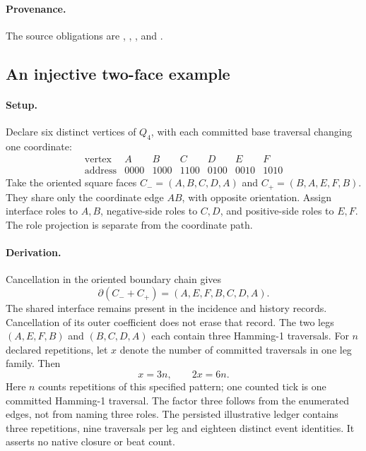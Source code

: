 \paragraph{Provenance.}
The source obligations are , , ,  and .

\subsection{An injective two-face example}\label{manual2:two-face-example}
\paragraph{Setup.}
Declare six distinct vertices of \(Q_4\), with each committed base traversal changing one coordinate:
\[
\begin{array}{c|cccccc}
\text{vertex}&A&B&C&D&E&F\\\hline
\text{address}&0000&1000&1100&0100&0010&1010
\end{array}
\]
Take the oriented square faces \(C_-=(A,B,C,D,A)\) and \(C_+=(B,A,E,F,B)\). They share only the coordinate edge \(AB\), with opposite orientation. Assign interface roles to \(A,B\), negative-side roles to \(C,D\), and positive-side roles to \(E,F\). The role projection is separate from the coordinate path.

\paragraph{Derivation.}
Cancellation in the oriented boundary chain gives
\[
\partial(C_-+C_+)=(A,E,F,B,C,D,A).
\]
The shared interface remains present in the incidence and history records. Cancellation of its outer coefficient does not erase that record. The two legs \((A,E,F,B)\) and \((B,C,D,A)\) each contain three Hamming-1 traversals. For \(n\) declared repetitions, let \(x\) denote the number of committed traversals in one leg family. Then
\begin{equation}
x=3n,\qquad 2x=6n.
\label{eq:manual2-three-plus-three}
\end{equation}
Here \(n\) counts repetitions of this specified pattern; one counted tick is one committed Hamming-1 traversal. The factor three follows from the enumerated edges, not from naming three roles. The persisted illustrative ledger contains three repetitions, nine traversals per leg and eighteen distinct event identities. It asserts no native closure or beat count.

